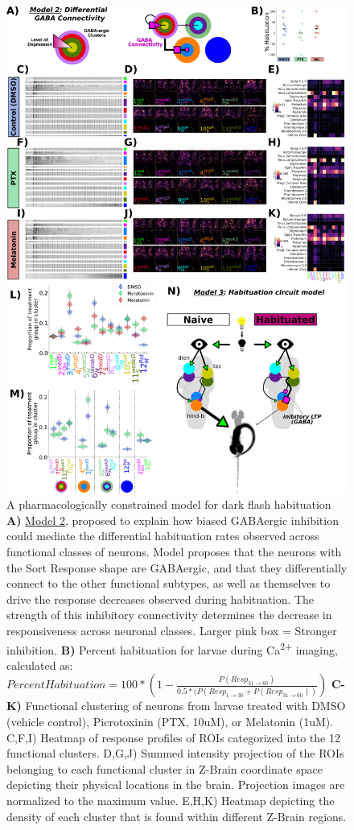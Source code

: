 \documentclass[9pt,lineno]{RandlettLab_elife}
\begin{document}
\begin{figure}
\begin{fullwidth}
\begin{center}
\includegraphics[width=0.6\linewidth]{Figure8 - Drugs.png}
\caption{
A pharmacologically constrained model for dark flash habituation
\textbf{A)} \underline{Model 2}, proposed to explain how biased GABAergic inhibition could mediate the differential habituation rates observed across functional classes of neurons. Model proposes that the neurons with the Sort Response shape are GABAergic, and that they differentially connect to the other functional subtypes, as well as themselves to drive the response decreases observed during habituation. The strength of this inhibitory connectivity determines the decrease in responsiveness across neuronal classes. Larger pink box = Stronger inhibition. 
\textbf{B)} Percent habituation for larvae during Ca\textsuperscript{2+} imaging, calculated as:
$Percent Habituation = 
100 * (1 - \frac{P(Resp_{31\rightarrow60})}{0.5*(P(Resp_{1\rightarrow30} + P(Resp_{31\rightarrow60}))})$
\textbf{C-K)} Functional clustering of neurons from larvae treated with DMSO (vehicle control), Picrotoxinin (PTX, 10uM), or Melatonin (1uM). 
C,F,I) Heatmap of response profiles of ROIs categorized into the 12 functional clusters. 
D,G,J) Summed intensity projection of the ROIs belonging to each functional cluster in Z-Brain coordinate space depicting their physical locations in the brain. Projection images are normalized to the maximum value. 
E,H,K) Heatmap depicting the density of each cluster that is found within different Z-Brain regions.
}
\end{center}
\end{fullwidth}
\end{figure}
\end{document}
